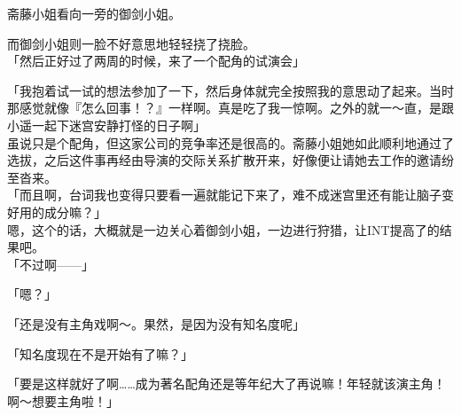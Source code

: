 斋藤小姐看向一旁的御剑小姐。

而御剑小姐则一脸不好意思地轻轻挠了挠脸。\\

「然后正好过了两周的时候，来了一个配角的试演会」

「我抱着试一试的想法参加了一下，然后身体就完全按照我的意思动了起来。当时那感觉就像『怎么回事！？』一样啊。真是吃了我一惊啊。之外的就一～直，是跟小遥一起下迷宫安静打怪的日子啊」\\

虽说只是个配角，但这家公司的竞争率还是很高的。斋藤小姐她如此顺利地通过了选拔，之后这件事再经由导演的交际关系扩散开来，好像便让请她去工作的邀请纷至沓来。\\

「而且啊，台词我也变得只要看一遍就能记下来了，难不成迷宫里还有能让脑子变好用的成分嘛？」\\

嗯，这个的话，大概就是一边关心着御剑小姐，一边进行狩猎，让INT提高了的结果吧。\\

「不过啊——」

「嗯？」

「还是没有主角戏啊～。果然，是因为没有知名度呢」

「知名度现在不是开始有了嘛？」

「要是这样就好了啊……成为著名配角还是等年纪大了再说嘛！年轻就该演主角！啊～想要主角啦！」\\


